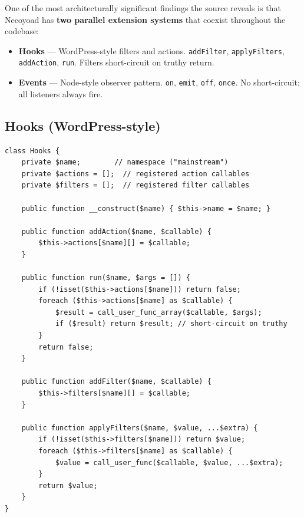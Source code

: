 \documentclass[11pt,a4paper]{article}
\begin{document}
One of the most architecturally significant findings the source
reveals is that Necoyoad has \textbf{two parallel extension systems}
that coexist throughout the codebase:

\begin{itemize}[leftmargin=1.6em,itemsep=2pt]
  \item \textbf{Hooks} --- WordPress-style filters and actions.
        \texttt{addFilter}, \texttt{applyFilters}, \texttt{addAction},
        \texttt{run}. Filters short-circuit on truthy return.
  \item \textbf{Events} --- Node-style observer pattern.
        \texttt{on}, \texttt{emit}, \texttt{off}, \texttt{once}.
        No short-circuit; all listeners always fire.
\end{itemize}

\subsection{Hooks (WordPress-style)}

\begin{lstlisting}[caption={\texttt{system/library/automation/hooks.php} --- the Hooks class (abridged).},label={lst:hooks}]
class Hooks {
    private $name;        // namespace ("mainstream")
    private $actions = [];  // registered action callables
    private $filters = [];  // registered filter callables

    public function __construct($name) { $this->name = $name; }

    public function addAction($name, $callable) {
        $this->actions[$name][] = $callable;
    }

    public function run($name, $args = []) {
        if (!isset($this->actions[$name])) return false;
        foreach ($this->actions[$name] as $callable) {
            $result = call_user_func_array($callable, $args);
            if ($result) return $result; // short-circuit on truthy
        }
        return false;
    }

    public function addFilter($name, $callable) {
        $this->filters[$name][] = $callable;
    }

    public function applyFilters($name, $value, ...$extra) {
        if (!isset($this->filters[$name])) return $value;
        foreach ($this->filters[$name] as $callable) {
            $value = call_user_func($callable, $value, ...$extra);
        }
        return $value;
    }
}
\end{lstlisting}
\end{document}
